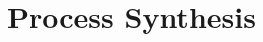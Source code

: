 \chapter{Process Synthesis}
\label{sec:synthesis}

\begin{refsection}







\clearpage
\printbibliography[heading=subbibintoc]



\begin{subappendices}
  
\end{subappendices}

\end{refsection}